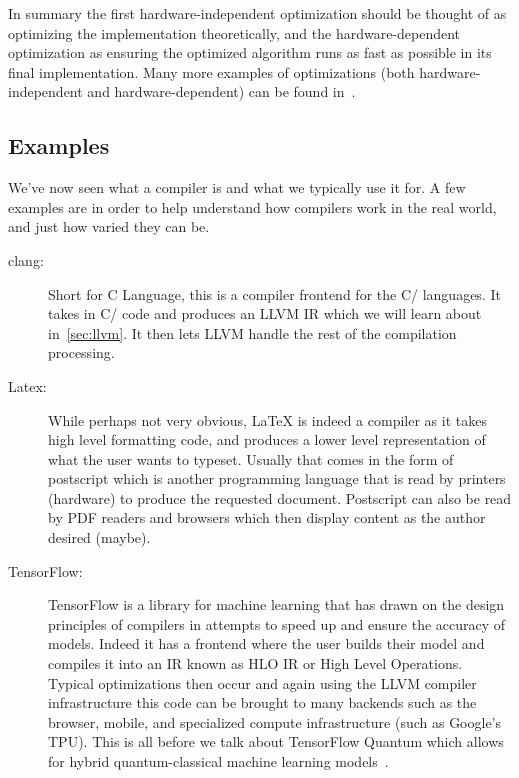 In summary the first hardware-independent optimization should be thought of as optimizing the implementation theoretically, and the hardware-dependent optimization as ensuring the optimized algorithm runs as fast as possible in its final implementation.
Many more examples of optimizations (both hardware-independent and hardware-dependent) can be found in~\cite[Chapter~8]{compiler-optimizations}.

\subsection{Examples}\label{sec:compiler-examples}

We've now seen what a compiler is and what we typically use it for.
A few examples are in order to help understand how compilers work in the real world, and just how varied they can be.

\begin{description}
    \item[clang:] Short for C Language, this is a compiler frontend for the C/\CPP{} languages. It takes in C/\CPP{} code and produces an LLVM \ac{IR} which we will learn about in~\cref{sec:llvm}. It then lets LLVM handle the rest of the compilation processing.
    \item[Latex:] While perhaps not very obvious, \LaTeX{} is indeed a compiler as it takes high level formatting code, and produces a lower level representation of what the user wants to typeset. Usually that comes in the form of postscript which is another programming language that is read by printers (hardware) to produce the requested document. Postscript can also be read by PDF readers and browsers which then display content as the author desired (maybe).
    \item[TensorFlow:] TensorFlow is a library for machine learning that has drawn on the design principles of compilers in attempts to speed up and ensure the accuracy of models. Indeed it has a frontend where the user builds their model and compiles it into an \ac{IR} known as HLO \ac{IR} or High Level Operations. Typical optimizations then occur and again using the LLVM compiler infrastructure this code can be brought to many backends such as the browser, mobile, and specialized compute infrastructure (such as Google's \ac{TPU}). This is all before we talk about TensorFlow Quantum which allows for hybrid quantum-classical machine learning models~\cite{tensoflowquantum}.
\end{description}

